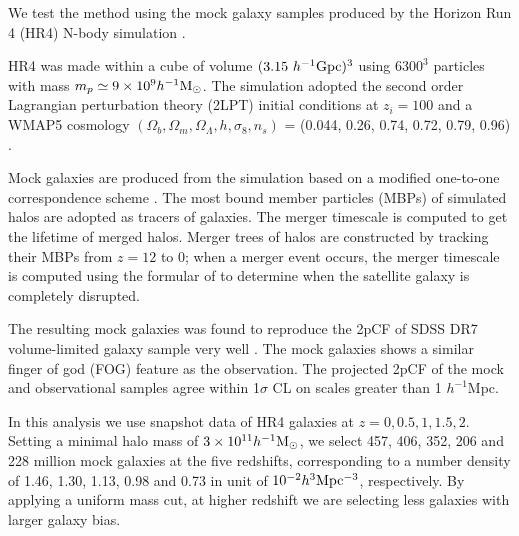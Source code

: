 \documentclass[iop]{emulateapj}
\newcommand{\hMsun}{{\ifmmode{h^{-1}{\rm
        {M_{\odot}}}}\else{$h^{-1}{\rm{M_{\odot}}}$~}\fi}}
\begin{document}
We test the method using the mock galaxy samples produced by the Horizon Run 4  (HR4) N-body simulation \citep{hr4,hong2016}.

HR4 was made within a cube of volume $({3.15}\ h^{-1}\rm Gpc)^3$ using  $6300^3$ particles with mass $m_p\simeq 9 \times 10^9 \hMsun$.
The simulation adopted the second order Lagrangian perturbation theory (2LPT) initial conditions at $z_{i}=100$
and a WMAP5 cosmology $(\Omega_{b},\Omega_{m},\Omega_\Lambda,h,\sigma_8,n_s)$  = (0.044, 0.26, 0.74, 0.72, 0.79, 0.96) \citep{komatsu 2011}.

Mock galaxies are produced from the simulation based on a modified one-to-one correspondence scheme \citep{hong2016}. 
The most bound member particles (MBPs) of simulated halos are adopted as tracers of galaxies.
The merger timescale is computed to get the lifetime of merged halos.
Merger trees of halos are constructed by tracking their MBPs from $z = 12$ to 0;
when a merger event occurs, the merger timescale is computed using the formular of \cite{jiang2008} to 
determine when the satellite galaxy is completely disrupted.

The resulting mock galaxies was found to reproduce the 2pCF of SDSS DR7 volume-limited galaxy sample \citep{zehavi2011} very well \citep{hong2016}.
The mock galaxies shows a similar finger of god (FOG) feature \citep{FOG} as the observation.
The projected 2pCF of the mock and observational samples agree within 1$\sigma$ CL
on scales greater than 1 ${h^{-1}}$Mpc.

In this analysis we use snapshot data of HR4 galaxies at $z=0,0.5,1,1.5,2$.
Setting a minimal halo mass of $3\times 10^{11} \hMsun$, 
we select 457, 406, 352, 206 and 228 million mock galaxies at the five redshifts,
corresponding to a number density of 
1.46, 1.30, 1.13, 0.98 and 0.73 in unit of $ 10^{-2} h^{3} \rm Mpc^{-3}$,
respectively.
By applying a uniform mass cut, at higher redshift we are selecting less galaxies with larger galaxy bias.
\end{document}
